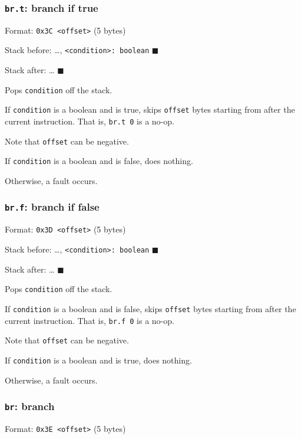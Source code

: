 \subsubsection{\texorpdfstring{\texttt{br.t}: branch if
true}{br.t: branch if true}}

Format: \texttt{0x3C\ \textless{}offset\textgreater{}} (5 bytes)

Stack before: \ldots,
\texttt{\textless{}condition\textgreater{}:\ boolean} \(\blacksquare\)

Stack after: \ldots{} \(\blacksquare\)

Pops \texttt{condition} off the stack.

If \texttt{condition} is a boolean and is true, skips \texttt{offset}
bytes starting from after the current instruction. That is,
\texttt{br.t\ 0} is a no-op.

Note that \texttt{offset} can be negative.

If \texttt{condition} is a boolean and is false, does nothing.

Otherwise, a fault occurs.

\subsubsection{\texorpdfstring{\texttt{br.f}: branch if
false}{br.f: branch if false}}

Format: \texttt{0x3D\ \textless{}offset\textgreater{}} (5 bytes)

Stack before: \ldots,
\texttt{\textless{}condition\textgreater{}:\ boolean} \(\blacksquare\)

Stack after: \ldots{} \(\blacksquare\)

Pops \texttt{condition} off the stack.

If \texttt{condition} is a boolean and is false, skips \texttt{offset}
bytes starting from after the current instruction. That is,
\texttt{br.f\ 0} is a no-op.

Note that \texttt{offset} can be negative.

If \texttt{condition} is a boolean and is true, does nothing.

Otherwise, a fault occurs.

\subsubsection{\texorpdfstring{\texttt{br}: branch}{br: branch}}

Format: \texttt{0x3E\ \textless{}offset\textgreater{}} (5 bytes)

